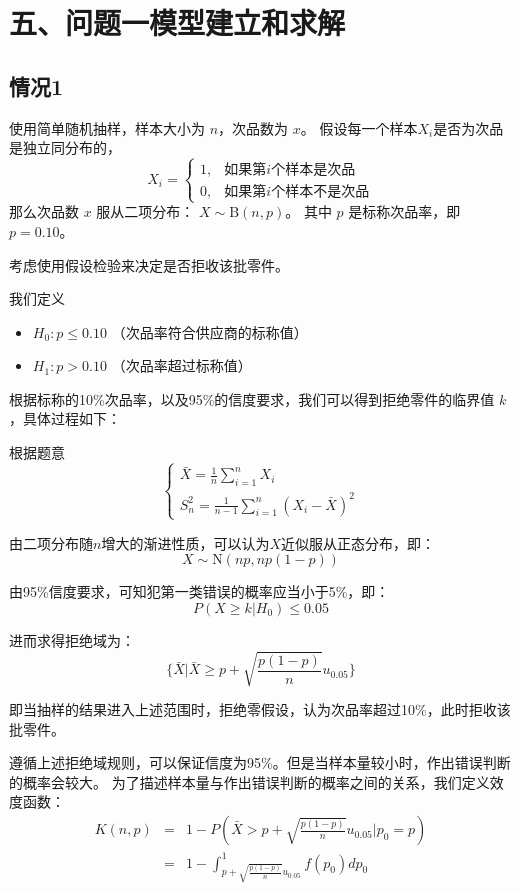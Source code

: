 \documentclass{article}
\begin{document}
	\section*{\centering 五、问题一模型建立和求解}
	

	
	\subsection*{情况1}
	使用简单随机抽样，样本大小为 $n$，次品数为 $x$。
	假设每一个样本$X_i$是否为次品是独立同分布的，
	\[
	X_i = \begin{cases}
		1, & \text{如果第$i$个样本是次品}  \\
		0, & \text{如果第$i$个样本不是次品}
	\end{cases}
	\]
	那么次品数 $x$ 服从二项分布： $X \sim \text{B}(n,p)$。
	其中 $p$ 是标称次品率，即 $p = 0.10$。
	
	考虑使用假设检验来决定是否拒收该批零件。
	
	我们定义
	\begin{itemize}
		\item $H_0: p \leq 0.10$ （次品率符合供应商的标称值）
		\item $H_1: p > 0.10$ （次品率超过标称值）
	\end{itemize}
	
	根据标称的10\%次品率，以及95\%的信度要求，我们可以得到拒绝零件的临界值 $k$，具体过程如下：
	
	根据题意
	\[
	\begin{cases}
		\bar X = \frac{1}{n} \sum_{i=1}^{n} X_i \\
		S_n^2 = \frac{1}{n-1} \sum_{i=1}^{n} (X_i - \bar X)^2
	\end{cases}
	\]
	
	由二项分布随$n$增大的渐进性质，可以认为$X$近似服从正态分布，即：
	\[
	X \sim \text{N}(np, np(1-p))
	\]
	
	由95\%信度要求，可知犯第一类错误的概率应当小于5\%，即：
	\[
	P(X \geq k | H_0) \leq 0.05
	\]
	
	进而求得拒绝域为：
	\[
	\{\bar X | \bar X \geq p + \sqrt{\frac{p(1-p)}{n}}u_{0.05}\}
	\]
	
	即当抽样的结果进入上述范围时，拒绝零假设，认为次品率超过10\%，此时拒收该批零件。
	
	遵循上述拒绝域规则，可以保证信度为95\%。但是当样本量较小时，作出错误判断的概率会较大。
	为了描述样本量与作出错误判断的概率之间的关系，我们定义效度函数：
	\begin{eqnarray} \label{eq}
		\nonumber K(n, p) & = & 1-P(\bar X > p + \sqrt{\frac{p(1-p)}{n}}u_{0.05} | p_0 = p)     \\
		\nonumber & = &1- \int_{p + \sqrt{\frac{p(1-p)}{n}}u_{0.05}}^{1} f(p_0) dp_0
	\end{eqnarray}
	
\end{document}
